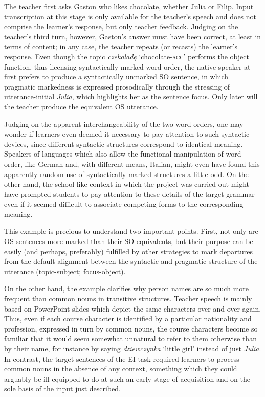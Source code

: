 The teacher first asks Gaston who likes chocolate, whether Julia or Filip. Input transcription at this stage is only available for the teacher's speech and does not comprise the learner's response, but only teacher feedback. Judging on the teacher's third turn, however, Gaston's answer must have been correct, at least in terms of content; in any case, the teacher repeats (or recasts) the learner’s response. Even though the topic \textit{czekoladę} ‘chocolate-\textsc{acc’} performs the object function, thus licensing syntactically marked word order, the native speaker at first prefers to produce a syntactically unmarked SO sentence, in which pragmatic markedness is expressed prosodically through the stressing of utterance-initial \textit{Julia}, which highlights her as the sentence focus. Only later will the teacher produce the equivalent OS utterance.

Judging on the apparent interchangeability of the two word orders, one may wonder if learners even deemed it necessary to pay attention to such syntactic devices, since different syntactic structures correspond to identical meaning. Speakers of languages which also allow the functional manipulation of word order, like German and, with different means, Italian, might even have found this apparently random use of syntactically marked structures a little odd. On the other hand, the school-like context in which the project was carried out might have prompted students to pay attention to these details of the target grammar even if it seemed difficult to associate competing forms to the corresponding meaning.

This example is precious to understand two important points. First, not only are OS sentences more marked than their SO equivalents, but their purpose can be easily (and perhaps, preferably) fulfilled by other strategies to mark departures from the default alignment between the syntactic and pragmatic structure of the utterance (topic-subject; focus-object).

On the other hand, the example clarifies why person names are so much more frequent than common nouns in transitive structures. Teacher speech is mainly based on PowerPoint slides which depict the same characters over and over again. Thus, even if each course character is identified by a particular nationality and profession, expressed in turn by common nouns, the course characters become so familiar that it would seem somewhat unnatural to refer to them otherwise than by their name, for instance by saying \textit{dziewczynka} ‘little girl’ instead of just \textit{Julia}. In contrast, the target sentences of the EI task required learners to process common nouns in the absence of any context, something which they could arguably be ill-equipped to do at such an early stage of acquisition and on the sole basis of the input just described.

